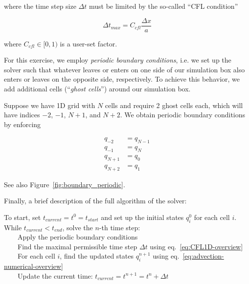 where the time step size $\Delta t$ must be limited by the so-called ``CFL condition''

\begin{equation}
	\Delta t_{max} = C_{cfl} \frac{\Delta x}{a} \label{eq:CFL1D-overview}
\end{equation}

where $C_{cfl} \in [0, 1) $ is a user-set factor.

For this exercise, we employ \emph{periodic boundary conditions}, i.e. we set up the solver such
that whatever leaves or enters on one side of our simulation box also enters or leaves on the
opposite side, respectively. To achieve this behavior, we add additional cells (``\emph{ghost
cells}'') around our simulation box.

Suppose we have 1D grid with $N$ cells and require 2 ghost cells each, which will have indices $-2$,
$-1$, $N+1$, and $N+2$. We obtain periodic boundary conditions by enforcing

\begin{align*}
	q_{-2} &= q_{N-1} \\
	q_{-1} &= q_{N}	\\
	q_{N+1} &= q_0 	\\
	q_{N+2} &= q_1
\end{align*}

See also Figure~\ref{fig:boundary_periodic}.


Finally, a brief description of the full algorithm of the solver:

\begin{tcolorbox}
To start, set $t_{current} = t^0 = t_{start}$ and set up the initial states $q_i^0$ for
each cell $i$.\\[.5em]
%
While $t_{current} < t_{end}$, solve the $n$-th time step:\\[.5em]
%
\indent~~~~Apply the periodic boundary conditions \\[.5em]
%
\indent~~~~Find the maximal permissible time step $\Delta t$ using eq.~\ref{eq:CFL1D-overview}
\\[.5em]
%
\indent~~~~For each cell $i$, find the updated states $q_i^{n+1}$ using
eq.~\ref{eq:advection-numerical-overview} \\[.5em]
%
\indent~~~~Update the current time: $t_{current} = t^{n+1} = t^n + \Delta t$

\end{tcolorbox}

\newpage